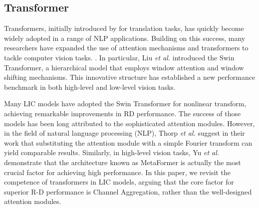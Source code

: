 \subsection{Transformer} 










Transformers, initially introduced by \cite{vaswani2017attention} for translation tasks, has quickly become widely adopted in a range of NLP applications. Building on this success, many researchers have expanded the use of attention mechanisms and transformers to tackle computer vision tasks. \cite{dosovitskiy2020image, liu2021swin, touvron2021training, zamir2022restormer, chen2022simple}. 
In particular, Liu \textit{et al.} \cite{liu2021swin} introduced the Swin Transformer, a hierarchical model that employs window attention and window shifting mechanisms. This innovative structure has established a new performance benchmark in both high-level \cite{xia2022vision, dong2022cswin, liu2022swin} and low-level  \cite{liang2021swinir, zamir2022restormer, chen2022simple, zhang2022practical} vision tasks.

Many LIC models have adopted the Swin Transformer for nonlinear transform, achieving remarkable improvements in RD performance.  
The success of those models has been long attributed to the sophisticated attention modules. However, in the field of natural language processing (NLP), Thorp \textit{et al.} suggest in their work \cite{lee2021fnet} that substituting the attention module with a simple Fourier transform can yield comparable results. Similarly, in high-level vision tasks, Yu \textit{et al.}~\cite{yu2022metaformer, yu2023metaformer} demonstrate that the architecture known as MetaFormer is actually the most crucial factor for achieving high performance.
In this paper, we revisit the competence of transformers in LIC models, arguing that the core factor for superior R-D performance is Channel Aggregation, rather than the well-designed attention modules.